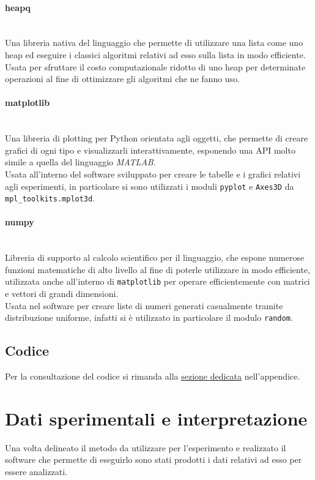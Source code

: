 \paragraph{heapq}\mbox{}\\
Una libreria nativa del linguaggio che permette di utilizzare una lista come uno heap ed eseguire i classici algoritmi relativi ad esso sulla lista in 
modo efficiente.\\
Usata per sfruttare il costo computazionale ridotto di uno heap per determinate operazioni al fine di ottimizzare gli algoritmi che ne fanno uso.

\paragraph{matplotlib}\mbox{}\\
Una libreria di plotting per Python orientata agli oggetti, che permette di creare grafici di ogni tipo e visualizzarli interattivamente, esponendo una API molto simile a quella del 
linguaggio \textit{MATLAB}.\\
Usata all'interno del software sviluppato per creare le tabelle e i grafici relativi agli esperimenti, in particolare si sono utilizzati i moduli \texttt{pyplot} 
e \texttt{Axes3D} da \texttt{mpl\_toolkits.mplot3d}.

\paragraph{numpy}\mbox{}\\
Libreria di supporto al calcolo scientifico per il linguaggio, che espone numerose funzioni matematiche di alto livello al fine di poterle utilizzare in modo
efficiente, utilizzata anche all'interno di \texttt{matplotlib} per operare efficientemente con matrici e vettori di grandi dimensioni.\\
Usata nel software per creare liste di numeri generati casualmente tramite distribuzione uniforme, infatti si è utilizzato in particolare il modulo
\texttt{random}.

\subsection{Codice}
Per la consultazione del codice si rimanda alla \hyperref[sec:Codice]{\underline{sezione dedicata}} nell'appendice.


\section{Dati sperimentali e interpretazione}
Una volta delineato il metodo da utilizzare per l'esperimento e realizzato il software che permette di eseguirlo sono stati prodotti i dati relativi ad esso
per essere analizzati.

